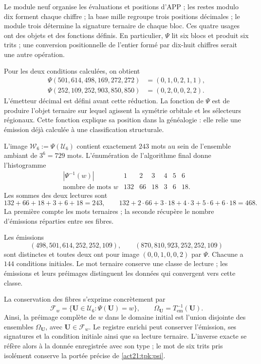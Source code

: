 Le module neuf organise les évaluations et positions d'APP ; les restes modulo dix forment chaque chiffre ; la base mille regroupe trois positions décimales ; le module trois détermine la signature ternaire de chaque bloc. Ces quatre usages ont des objets et des fonctions définis. En particulier, \(\Psi\) lit six blocs et produit six trits ; une conversion positionnelle de l'entier formé par dix-huit chiffres serait une autre opération.

Pour les deux conditions calculées, on obtient
\begin{align*}
 \Psi(501,614,498,169,272,272)&=(0,1,0,2,1,1),\\
 \Psi(252,109,252,903,850,850)&=(0,2,0,0,2,2).
\end{align*}
L'émetteur décimal est défini avant cette réduction. La fonction de
\(\Psi\) est de produire l'objet ternaire sur lequel agissent la symétrie
orbitale et les sélecteurs régionaux. Cette fonction explique sa position dans la
généalogie : elle relie une émission déjà calculée à une classification structurale.

L'image \(\mathcal W_6:=\Psi(\mathcal U_6)\) contient exactement
\(243\) mots au sein de l'ensemble ambiant de \(3^6=729\) mots.
L'énumération de l'algorithme final donne l'histogramme
\begin{equation}
\begin{array}{c|rrrrrr}
 |\Psi^{-1}(w)|&1&2&3&4&5&6\\\hline
 \text{nombre de mots }w&132&66&18&3&6&18.
\end{array}
\label{act21:tpk:fibras-ternarias}
\end{equation}
Les sommes des deux lectures sont
\[
132+66+18+3+6+18=243,
\qquad132+2\cdot66+3\cdot18+4\cdot3+5\cdot6+6\cdot18=468.
\]
La première compte les mots ternaires ; la seconde récupère le nombre d'émissions réparties entre ses fibres.

\begin{example}
\label{act21:tpk:colision}
Les émissions
\[
 (498,501,614,252,252,109),\qquad
 (870,810,923,252,252,109)
\]
sont distinctes et toutes deux ont pour image \((0,0,1,0,0,2)\) par \(\Psi\).
Chacune a \(144\) conditions initiales. Le mot ternaire conserve
une classe de lecture ; les émissions et leurs préimages distinguent les données
qui convergent vers cette classe.
\end{example}

La conservation des fibres s'exprime concrètement par
\[
 \mathcal F_w=\{\mathbf U\in\mathcal U_6:\Psi(\mathbf U)=w\},
 \qquad
 \Omega_{\mathbf U}=T_{\mathrm{em}}^{-1}(\mathbf U).
\]
Ainsi, la préimage complète de \(w\) dans le domaine initial est l'union disjointe des ensembles \(\Omega_{\mathbf U}\), avec \(\mathbf U\in\mathcal F_w\). Le registre enrichi peut conserver l'émission, ses signatures et la condition initiale ainsi que sa lecture ternaire. L'inverse exacte se réfère alors à la donnée enregistrée avec son type ; le mot de six trits pris isolément conserve la portée précise de \eqref{act21:tpk:psi}.

